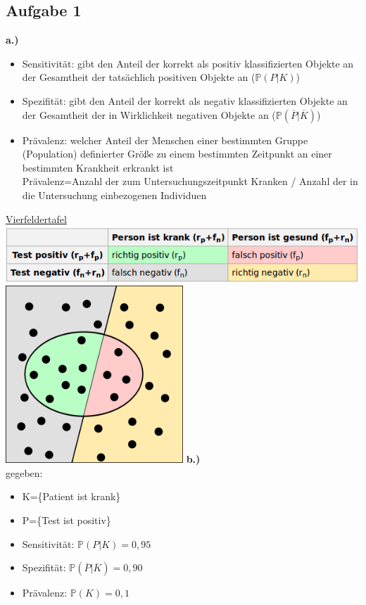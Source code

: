 \documentclass[13pt,a4paper]{article}
\begin{document}
\subsection{Aufgabe 1}
\textbf{a.)}
\begin{itemize}
	\item Sensitivität: gibt den Anteil der korrekt als positiv klassifizierten Objekte an der Gesamtheit der tatsächlich positiven Objekte an ($\mathbb{P}(P|K)$)
	\item Spezifität: gibt den Anteil der korrekt als negativ klassifizierten Objekte an der Gesamtheit der in Wirklichkeit negativen Objekte an ($\mathbb{P}(\overline{P}|\overline{K})$)
	\item Prävalenz: welcher Anteil der Menschen einer bestimmten Gruppe (Population) definierter Größe zu einem bestimmten Zeitpunkt an einer bestimmten Krankheit erkrankt ist\\
	Prävalenz=Anzahl der zum Untersuchungszeitpunkt Kranken / Anzahl der in die Untersuchung einbezogenen Individuen
\end{itemize}

\underline{Vierfeldertafel}\\
\includegraphics[width=1\textwidth]{pix/exercise3/Konfusionsmatrix.png}
\includegraphics[width=0.5\textwidth]{pix/exercise3/Binary-classification-file.png}
\newpage
\textbf{b.)}\\
gegeben:
\begin{itemize}
	\item K=\{Patient ist krank\}
	\item P=\{Test ist positiv\}
	\item Sensitivität: $\mathbb{P}(P|K)=0,95$
	\item Spezifität: $\mathbb{P}(\overline{P}|\overline{K})=0,90$
	\item Prävalenz: $\mathbb{P}(K)=0,1$
\end{itemize}
\end{document}
